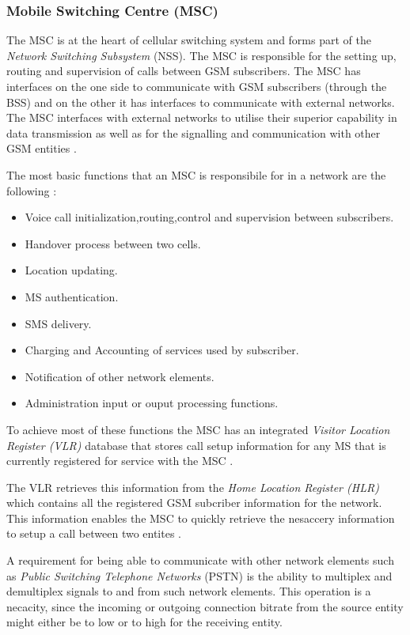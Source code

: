 \subsubsection{Mobile Switching Centre (MSC)}

The MSC is at the heart of cellular switching system and forms part of the \emph{Network Switching Subsystem} (NSS). The MSC is responsible for the setting up, routing and supervision of calls between GSM subscribers. The MSC has interfaces on the one side to communicate with GSM subscribers (through the BSS) and on the other it has interfaces to communicate with external networks. The MSC interfaces with external networks to utilise their superior capability in data transmission as well as for the signalling and communication with other GSM entities \cite{GSM92}. 

The most basic functions that an MSC is responsibile for in a network are the following \cite{wirelesstelcoMullet}:
\begin{itemize}
\item Voice call initialization,routing,control and supervision between subscribers.
\item Handover process between two cells.
\item Location updating.
\item MS authentication.
\item SMS delivery.
\item Charging and Accounting of services used by subscriber.
\item Notification of other network elements.
\item Administration input or ouput processing functions.
\end{itemize}

To achieve most of these functions the MSC has an integrated \emph{Visitor Location Register (VLR)} database that stores call setup information for any MS that is currently registered for service with the MSC \cite{GSM92,wirelesstelcoMullet}. 

The VLR retrieves this information from the \emph{Home Location Register (HLR)} which contains all the registered GSM subcriber information for the network. This information enables the MSC to quickly retrieve the nesaccery information to setup a call between two entites \cite{GSMSysEngin,GSMSecurInTeleNetwork}.

A requirement for being able to communicate with other network elements such as \emph{Public Switching Telephone Networks} (PSTN) is the ability to multiplex and demultiplex signals to and from such network elements. This operation is a necacity, since the incoming or outgoing connection bitrate from the source entity might either be to low or to high for the receiving entity.

